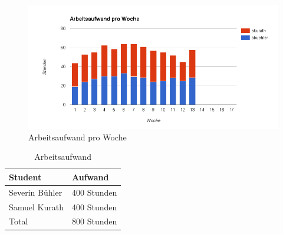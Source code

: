 \begin{figure}[H]
	\centering
	\includegraphics[width=480pt]{images/arbeits_aufwand_pro_woch.png}
	\caption{Arbeitsaufwand pro Woche}
\end{figure}

\begin{table}[H]
	\centering
    \begin{tabular}{|p{6cm}|p{6cm}|}
    \hline    
    \rowcolor{lightblue}
	Student & Aufwand \\ \hline   
	Severin Bühler & 400 Stunden \\ \hline
	Samuel Kurath & 400 Stunden \\ \hline
	\rowcolor{lightblue}
	Total & 800 Stunden \\ \hline
    \end{tabular}
    \caption[Arbeitsaufwand]{Arbeitsaufwand}
\end{table}

\newpage
